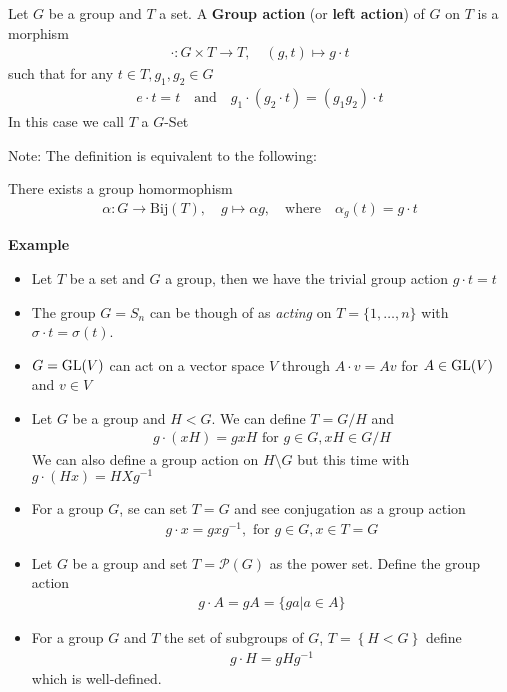 \begin{definition}[]
	Let $G$ be a group and $T$ a set. A \textbf{Group action} (or \textbf{left action}) of $G$ on $T$ is a morphism
	\begin{align*}
		\cdot: G \times T \to T, \quad (g,t) \mapsto g \cdot t	
	\end{align*}
	such that for any $t \in T, g_1,g_2 \in G$
	\begin{align*}
		e \cdot t = t \quad \text{and} \quad g_1 \cdot (g_2 \cdot t) = (g_1g_2) \cdot t
	\end{align*}
	In this case we call $T$ a $G$-Set
\end{definition} 

Note: The definition is equivalent to the following:

There exists a group homormophism
\begin{align*}
	\alpha: G \to \text{Bij}(T), \quad g \mapsto \alpha g, \quad \text{where} \quad \alpha_g(t) = g \cdot t
\end{align*}

\textbf{Example}
\begin{itemize}
	\item Let $T$ be a set and $G$ a group, then we have the trivial group action $g \cdot t = t$ 
	\item The group $G = S_n$ can be though of as \emph{acting} on $T = \{ 1, \ldots, n\}$ with $\sigma \cdot t = \sigma(t)$.
	\item $G = \operatorname{GL}(V)$ can act on a vector space $V$ through $A \cdot v = Av$ for $A \in \operatorname{GL}(V)$ and $v \in V$
	\item Let $G$ be a group and $H < G$. We can define $T = G/H$ and
		\begin{align*}
			g \cdot (xH) = gxH \text{ for } g \in G, xH \in G/H
		\end{align*}
		We can also define a group action on $H \setminus G$ but this time with $g \cdot (Hx) = HXg^{-1}$
	\item For a group $G$, se can set $T = G$ and see conjugation as a group action
		\begin{align*}
			g \cdot x = gxg^{-1}, \text{ for } g \in G, x \in T = G
		\end{align*}
	\item Let $G$ be a group and set $T = \mathcal{P}(G)$ as the power set. Define the group action
		\begin{align*}
			g \cdot A = gA = \{ga \big\vert a \in A\}
		\end{align*}
	\item For a group $G$ and $T$ the set of subgroups of $G$, $T = \left\{H < G\right\}$ define
		\begin{align*}
			g \cdot H = gH g^{-1}
		\end{align*}
		which is well-defined.
\end{itemize}


